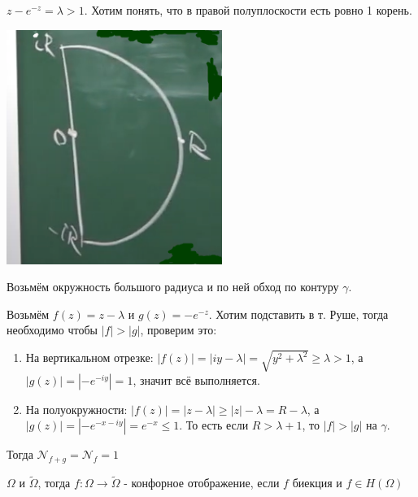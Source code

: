 \begin{example}
    $z - e^{-z} = \lambda > 1$. Хотим понять, что в правой полуплоскости есть ровно 1 корень.

    \begin{center}
        \includegraphics[width=7cm]{assets/04-functions-of-complex-variables/rushe-example.png}
    \end{center}

    Возьмём окружность большого радиуса и по ней обход по контуру $\gamma$.

    Возьмём $f(z) = z - \lambda$ и $g(z) = -e^{-z}$. Хотим подставить в т. Руше, тогда необходимо чтобы $|f| > |g|$, проверим это:

    \begin{enumerate}
        \item {
            На вертикальном отрезке: $|f(z)| = |iy - \lambda| = \sqrt{y^2 + \lambda^2} \geqslant \lambda > 1$, а
            $|g(z)| = |-e^{-iy}| = 1$, значит всё выполняется.
        }
        \item {
            На полуокружности: $|f(z)| = |z - \lambda| \geqslant |z| - \lambda = R - \lambda$, а $|g(z)| = |-e^{-x - iy}| = e^{-x} \leqslant 1$. То есть если $R > \lambda + 1$, то $|f| > |g|$ на $\gamma$.
        }
    \end{enumerate}

    Тогда $\mathcal{N}_{f + g} = \mathcal{N}_f = 1$
\end{example}


\begin{definition}
    $\Omega$ и $\tilde{\Omega}$, тогда $f: \Omega \to \tilde{\Omega}$ - конфорное отображение,
    если $f$ биекция и $f \in H(\Omega)$
\end{definition}

